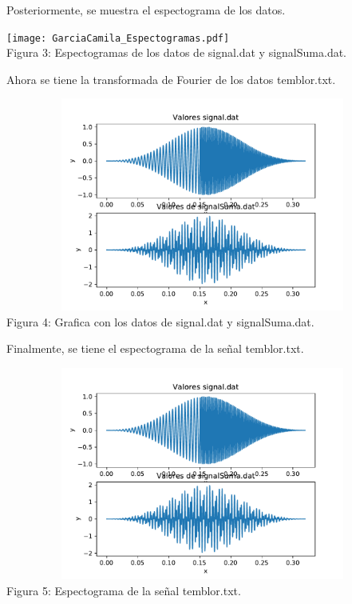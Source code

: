 \documentclass{article}
\begin{document}
Posteriormente, se muestra el espectograma de los datos.

\begin{center}
\texttt{[image: GarciaCamila\_Espectogramas.pdf]}\\
\small{Figura 3: Espectogramas de los datos de signal.dat y signalSuma.dat.}
\end{center}

Ahora se tiene la transformada de Fourier de los datos temblor.txt.

\begin{center}
\includegraphics[width=13cm, height=7cm]{GarciaCamila_SubplotsGraficas.pdf}\\
\small{Figura 4: Grafica con los datos de signal.dat y signalSuma.dat.}
\end{center}

Finalmente, se tiene el espectograma de la señal temblor.txt.

\begin{center}
\includegraphics[width=13cm, height=7cm]{GarciaCamila_SubplotsGraficas.pdf}\\
\small{Figura 5: Espectograma de la señal temblor.txt.}
\end{center}
\end{document}
